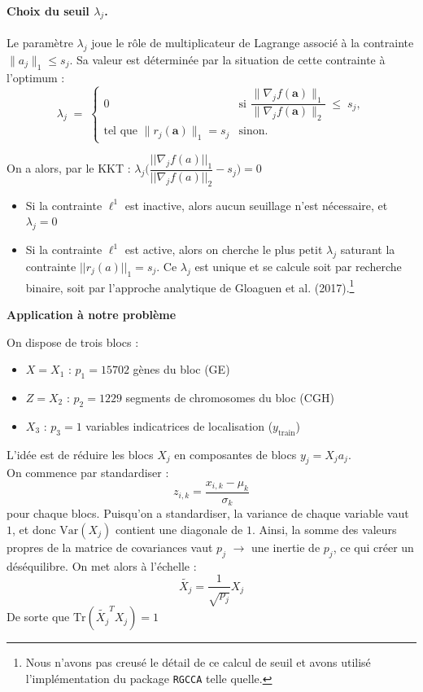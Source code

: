 \documentclass[a4paper,11pt]{paper}
\theoremstyle{plain}
\theoremstyle{definition}
\theoremstyle{remark}
\begin{document}
\paragraph{Choix du seuil $\lambda_j$.}
Le paramètre $\lambda_j$ joue le rôle de multiplicateur de Lagrange associé à la contrainte $\|a_j\|_1 \leqslant s_j$. Sa valeur est
déterminée par la situation de cette contrainte à l'optimum :
\[
    \lambda_j \;=\;
    \begin{cases}
        0                                           & \text{si } \dfrac{\|\nabla_j f(\mathbf{a})\|_1}{\|\nabla_j f(\mathbf{a})\|_2}
        \;\leqslant\; s_j,                                                                                                          \\[1.2em]
        \text{tel que } \|r_j(\mathbf{a})\|_1 = s_j & \text{sinon.}
    \end{cases}
\]

On a alors, par le KKT : $\lambda_j \bigg(\dfrac{||\nabla_j f(a)||_1}{||\nabla_j f(a)||_2} - s_j\bigg) = 0$
\begin{itemize}
    \item Si la contrainte $\ell^1$ est inactive, alors aucun seuillage n'est nécessaire, et $\lambda_j = 0$
    \item Si la contrainte $\ell^1$ est active, alors on cherche le plus petit $\lambda_j$ saturant la contrainte $||r_j(a)||_1 = s_j$. Ce $\lambda_j$ est unique et se calcule soit par recherche binaire, soit par l'approche analytique de Gloaguen et al. (2017).\footnote{Nous n'avons pas creusé le détail de ce calcul de seuil et avons utilisé l'implémentation du package \texttt{RGCCA} telle quelle.}
\end{itemize}


\begin{center}
    \Large \textbf{Application à notre problème}
\end{center}

On dispose de trois blocs :
\begin{itemize}
    \item $X = X_1$ : $p_1 = 15702$ gènes du bloc (GE)
    \item $Z = X_2$ : $p_2 = 1229$ segments de chromosomes du bloc (CGH)
    \item $X_3$ : $p_3 = 1$ variables indicatrices de localisation ($y_{\text{train}}$)
\end{itemize}

L'idée est de réduire les blocs $X_j$ en composantes de blocs $y_j = X_ja_j$. \\
On commence par standardiser :
$$z_{i,k} = \dfrac{x_{i,k} - \mu_k}{\sigma_k}$$
pour chaque blocs. Puisqu'on a standardiser, la variance de chaque variable vaut $1$, et donc $\text{Var}(X_j)$ contient une diagonale de $1$. Ainsi, la somme des valeurs propres de la matrice de covariances vaut $p_j$ $\longrightarrow$ une inertie de $p_j$, ce qui créer un déséquilibre. On met alors à l'échelle :
$$\tilde {X_j} = \dfrac{1}{\sqrt{p_j}}X_j$$
De sorte que $\text{Tr}(\tilde{X_j}^TX_j) = 1$
\end{document}
